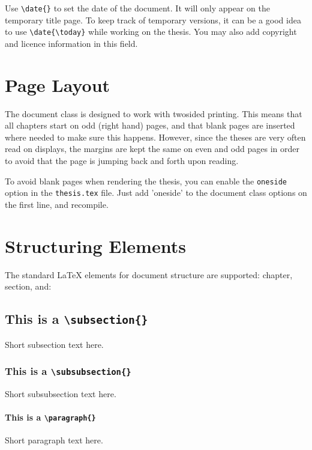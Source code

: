 Use \texttt{\textbackslash date\{\}} to set the date of the document. It will only  appear on the temporary title page. To keep track of temporary versions, it can be a good idea to use \texttt{\textbackslash date\{\textbackslash today\}} while working on the thesis. You may also add copyright and licence information in this field.

\section{Page Layout}

The document class is designed to work with twosided printing. This means that all chapters start on odd (right hand) pages, and that blank pages are inserted where needed to make sure this happens. However, since the theses are very often read on displays, the margins are kept the same on even and odd pages in order to avoid that the page is jumping back and forth upon reading.

To avoid blank pages when rendering the thesis, you can enable the \texttt{oneside} option in the \texttt{thesis.tex} file. Just add 'oneside' to the document class options on the first line, and recompile.

\section{Structuring Elements}

The standard \LaTeX{} elements for document structure are supported: chapter, section, and:

\subsection{This is a \texttt{\textbackslash subsection\{\}}}

Short subsection text here.

\subsubsection{This is a \texttt{\textbackslash subsubsection\{\}}}

Short subsubsection text here.

\paragraph{This is a \texttt{\textbackslash paragraph\{\}}}

Short paragraph text here.

